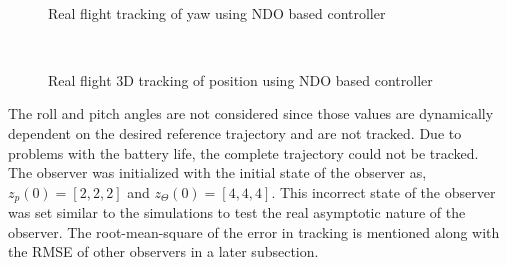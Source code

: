 \documentclass[letterpaper%
, twoside%
, 12pt%
,memoire%
, english%
,creativecommons,hyperref%
]{thETS}
\begin{document}
\begin{figure}[H]
	\centering
	 \\ \parbox{0.75\textwidth}{\caption{Real flight tracking of yaw using NDO based controller\label{Fig:yawtracNDODist}}}
\end{figure}
\begin{figure}[H]
	\centering
	 \\ \parbox{0.75\textwidth}{\caption{Real flight 3D tracking of position using NDO based controller\label{Fig:3dNDODist}}}
\end{figure}
The roll and pitch angles are not considered since those values are dynamically dependent on the desired reference trajectory and are not tracked. Due to problems with the battery life, the complete trajectory could not be tracked. \\
The observer was initialized with the initial state of the observer as, $z_p(0)=[2,2,2]$ and $z_\Theta(0)=[4,4,4]$. This incorrect state of the observer was set similar to the simulations to test the real asymptotic nature of the observer. The root-mean-square of the error in tracking is mentioned along with the RMSE of other observers in a later subsection.
\FloatBarrier
\end{document}
